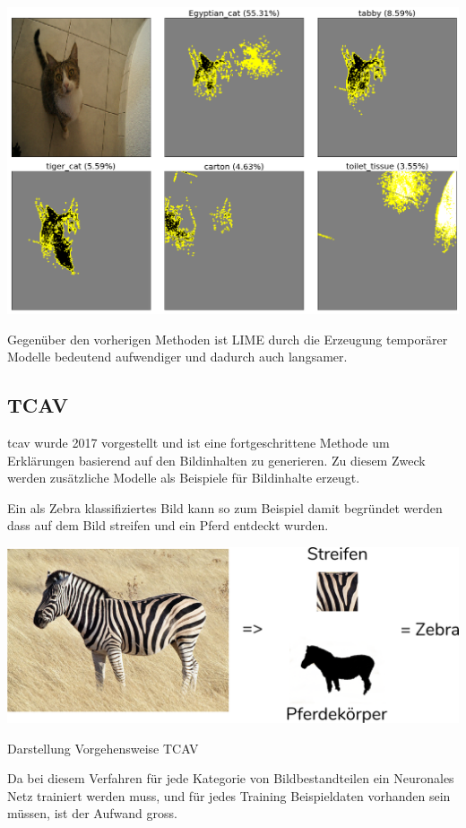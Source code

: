\documentclass[
  12pt, %
  a4paper, %
  oneside, %
  openany, 
  numbers=noenddot, %
  BCOR=5mm, %
  parskip=half*, %
  thesis, %
]{bfhbook}
\begin{document}
\includegraphics[width=\textwidth]{Bilder/Lime-Classes.png}

Gegenüber den vorherigen Methoden ist LIME durch die Erzeugung temporärer Modelle bedeutend aufwendiger und dadurch auch langsamer.
\clearpage
\subsection{TCAV}
 \acrfull{tcav} wurde 2017 vorgestellt \parencite{Kim2017} und ist eine fortgeschrittene Methode um Erklärungen basierend auf den Bildinhalten zu generieren. Zu diesem Zweck werden zusätzliche Modelle als Beispiele für Bildinhalte erzeugt.
 
\break
 Ein als Zebra klassifiziertes Bild kann so zum Beispiel damit begründet werden dass auf dem Bild streifen und ein Pferd entdeckt wurden.
\begin{center}
\begin{minipage}[t]{\linewidth}
\includegraphics[width=\textwidth]{Bilder/Zebra-Explanation.PNG}
\caption{Darstellung Vorgehensweise TCAV}
\end{minipage}
\end{center}
Da bei diesem Verfahren für jede Kategorie von Bildbestandteilen ein Neuronales Netz trainiert werden muss, und für jedes Training Beispieldaten vorhanden sein müssen, ist der Aufwand gross. 
\end{document}
